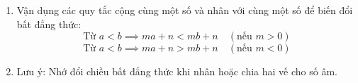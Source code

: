 \begin{enumerate}
\item Vận dụng các quy tắc cộng cùng một số và nhân với cùng một số để biến đổi bất đẳng thức:
$$\text{Từ } a < b \implies ma + n < mb + n\quad (\text{nếu } m > 0)$$
$$\text{Từ } a < b \implies ma + n > mb + n\quad (\text{nếu } m < 0)$$
\item Lưu ý: Nhớ đổi chiều bất đẳng thức khi nhân hoặc chia hai vế cho số âm.
\end{enumerate}
